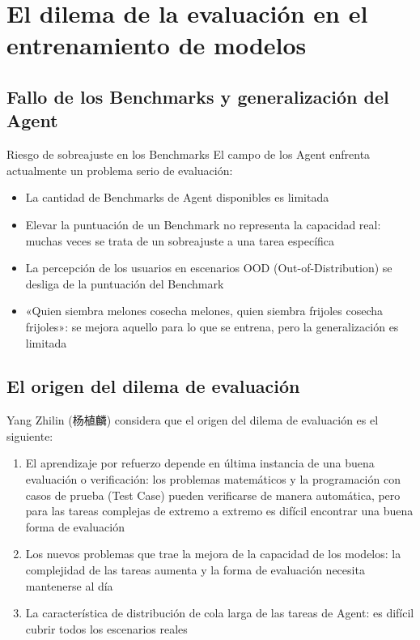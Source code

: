 \section{El dilema de la evaluación en el entrenamiento de modelos}

\subsection{Fallo de los Benchmarks y generalización del Agent}

\begin{warningbox}{Riesgo de sobreajuste en los Benchmarks}
El campo de los Agent enfrenta actualmente un problema serio de evaluación:
\begin{itemize}
    \item La cantidad de Benchmarks de Agent disponibles es limitada
    \item Elevar la puntuación de un Benchmark no representa la capacidad real: muchas veces se trata de un sobreajuste a una tarea específica
    \item La percepción de los usuarios en escenarios OOD (Out-of-Distribution) se desliga de la puntuación del Benchmark
    \item «Quien siembra melones cosecha melones, quien siembra frijoles cosecha frijoles»: se mejora aquello para lo que se entrena, pero la generalización es limitada
\end{itemize}
\end{warningbox}

\subsection{El origen del dilema de evaluación}

Yang Zhilin (杨植麟) considera que el origen del dilema de evaluación es el siguiente:

\begin{enumerate}
    \item El aprendizaje por refuerzo depende en última instancia de una buena evaluación o verificación: los problemas matemáticos y la programación con casos de prueba (Test Case) pueden verificarse de manera automática, pero para las tareas complejas de extremo a extremo es difícil encontrar una buena forma de evaluación
    \item Los nuevos problemas que trae la mejora de la capacidad de los modelos: la complejidad de las tareas aumenta y la forma de evaluación necesita mantenerse al día
    \item La característica de distribución de cola larga de las tareas de Agent: es difícil cubrir todos los escenarios reales
\end{enumerate}

